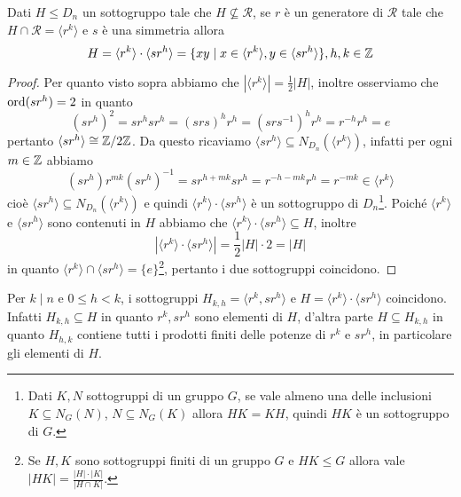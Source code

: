 \documentclass[11pt]{scrartcl}
\begin{document}
\begin{proposition}
    Dati $H\leqslant D_n$ un sottogruppo tale che $H\nsubseteq \mathcal{R}$, se
    $r$ è un generatore di $\mathcal{R}$ tale che $H\cap\mathcal{R} = \langle r^k\rangle$ 
    e $s$ è una simmetria allora \[
    H = \langle r^k\rangle\cdot\langle sr^h\rangle = \{xy \mid x \in \langle r^k\rangle,
    y \in \langle sr^h\rangle\}, h, k \in \mathbb Z
    \]
\end{proposition}

\begin{proof}
    Per quanto visto sopra abbiamo che $|\langle r^k\rangle| = 
    \displaystyle\frac 1 2|H|$, inoltre osserviamo che $\operatorname{ord}(sr^h) = 2$ in quanto
    \[
        (sr^h)^2 = sr^hsr^h = (srs)^hr^h = (srs^{-1})^hr^h = r^{-h}r^h = e
    \]
    pertanto $\langle sr^h\rangle \cong \mathbb{Z}/{2}\mathbb{Z}$. Da questo ricaviamo $\langle sr^h\rangle
    \subseteq N_{D_n}(\langle r^k\rangle)$, infatti per ogni $m \in \mathbb Z$ abbiamo\[
        (sr^h)r^{mk}(sr^h)^{-1} = sr^{h + mk} sr^h = r^{-h-mk}r^h = r^{-mk}
        \in \langle r^k \rangle
    \]cioè $\langle sr^h\rangle \subseteq N_{D_n}(\langle r^k\rangle)$ e quindi
    $\langle r^k\rangle\cdot\langle sr^h\rangle$ è un sottogruppo di $D_n$\footnote
    {Dati $K, N$ sottogruppi
    di un gruppo $G$, se vale almeno una delle inclusioni $K \subseteq N_G(N)$,
    $N \subseteq N_G(K)$ allora $HK = KH$, quindi $HK$ è un sottogruppo di $G$.}.
    Poiché $\langle r^k\rangle$ e $\langle sr^h\rangle$ sono contenuti in $H$
    abbiamo che $\langle r^k\rangle\cdot\langle sr^h\rangle \subseteq H$, inoltre
    \[|\langle r^k\rangle\cdot\langle sr^h\rangle| = \displaystyle\frac 1 2 |H|\cdot 2 = |H|\]
    in quanto $\langle r^k\rangle\cap\langle sr^h\rangle = \{e\}$\footnote{
        Se $H, K$ sono sottogruppi finiti di un gruppo $G$ e $HK\leqslant G$ allora
        vale $|HK| = \displaystyle\frac{|H|\cdot|K|}{|H\cap K|}$.
    }, pertanto 
    i due sottogruppi coincidono.
\end{proof}

\begin{remark}
    Per $k \mid n$ e $0\leqslant h < k$, i sottogruppi $H_{k, h} = \langle r^k, sr^h\rangle$
    e $H = \langle r^k\rangle\cdot\langle sr^h\rangle$ coincidono. Infatti 
    $H_{k, h}\subseteq H$ in quanto $r^k, sr^h$ sono elementi di $H$, 
    d'altra parte $H \subseteq H_{k, h}$ in quanto $H_{h, k}$ contiene tutti i 
    prodotti finiti delle potenze di $r^k$ e $sr^h$, in particolare gli elementi di $H$.
\end{remark}
\end{document}
